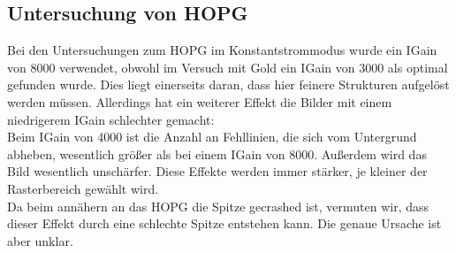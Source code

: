 \documentclass[12pt,a4paper]{article}
\begin{document}
\subsection{Untersuchung von HOPG}
Bei den Untersuchungen zum HOPG im Konstantstrommodus wurde ein IGain von 8000 verwendet, obwohl im Versuch mit Gold ein IGain von 3000 als optimal gefunden wurde. Dies liegt einerseits daran, dass hier feinere Strukturen aufgelöst werden müssen. Allerdings hat ein weiterer Effekt die Bilder mit einem niedrigerem IGain schlechter gemacht:\\
Beim IGain von 4000 ist die Anzahl an Fehllinien, die sich vom Untergrund abheben, wesentlich größer als bei einem IGain von 8000. Außerdem wird das Bild wesentlich unschärfer. Diese Effekte werden immer stärker, je kleiner der Rasterbereich gewählt wird.\\
Da beim annähern an das HOPG die Spitze gecrashed ist, vermuten wir, dass dieser Effekt durch eine schlechte Spitze entstehen kann. Die genaue Ursache ist aber unklar.\\
\\
\end{document}

